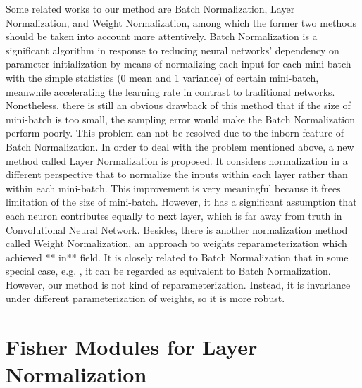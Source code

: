 \documentclass{sig-alternate}
\begin{document}
    Some related works to our method are Batch Normalization, Layer Normalization, and Weight Normalization, among which the former two methods should be taken into account more attentively.
    Batch Normalization is a significant algorithm in response to reducing neural networks’ dependency on parameter initialization by means of normalizing each input for each mini-batch with the simple statistics (0 mean and 1 variance) of certain mini-batch, meanwhile accelerating the learning rate in contrast to traditional networks. 
    Nonetheless, there is still an obvious drawback of this method that if the size of mini-batch is too small, the sampling error would make the Batch Normalization perform poorly. This problem can not be resolved due to the inborn feature of Batch Normalization.
    In order to deal with the problem mentioned above, a new method called Layer Normalization is proposed. It considers normalization in a different perspective that to normalize the inputs within each layer rather than within each mini-batch. This improvement is very meaningful because it frees limitation of the size of mini-batch. However, it has a significant assumption that each neuron contributes equally to next layer, which is far away from truth in Convolutional Neural Network.
    Besides, there is another normalization method called Weight Normalization, an approach to weights reparameterization which achieved ** in** field. It is closely related to Batch Normalization that in some special case, e.g. , it can be regarded as equivalent to Batch Normalization. However, our method is not kind of reparameterization. Instead, it is invariance under different parameterization of weights, so it is more robust.
\section{Fisher Modules for Layer Normalization}
\end{document}
